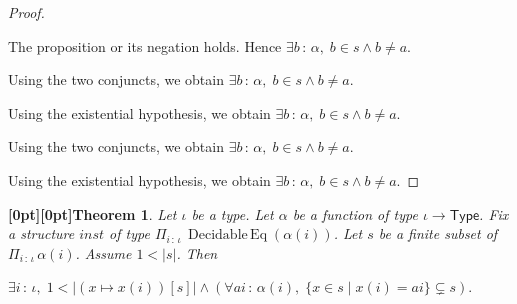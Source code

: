 \documentclass{article}
\makeatletter
\newcommand{\paperanchor}[1]{\hypertarget{#1}{}}%
\def\paperdest{\pdfextension dest}\def\paperstart{\pdfextension startlink}%
\def\paperend{\pdfextension endlink}\def\papercolor{\pdfextension colorstack}%
\let\paperdest\pdfdest\let\paperstart\pdfstartlink\let\paperend\pdfendlink\let\papercolor\pdfcolorstack
\newcommand{\paperanchor}[1]{\paperdest name{#1} xyz}%
\newcommand{\paperanchor}[1]{\special{pdf:dest (#1) [@thispage /XYZ null @ypos null]}}%
\newcommand{\paperlineanchor}[1]{\raisebox{10pt}[0pt][0pt]{\paperanchor{#1}}}
\DeclareRobustCommand{\paperresultname}[1]{\paperlineanchor{theorem:\arabic{theorem}}#1}
\theoremstyle{paperresult}
\newtheorem{theorem}{\paperresultname{Theorem}}
\newenvironment{proofstep}{\par\smallskip\ifdim\leftskip<3em\relax\advance\leftskip by 1em\relax\fi\noindent\ignorespaces}{\par\smallskip}
\makeatother
\begin{document}
\begin{proof}
\begin{proofstep}
\begin{proofstep}
\begin{proofstep}
\begin{proofstep}
\begin{proofstep}
\end{proofstep}
The proposition or its negation holds. Hence \(\exists b\, :\, \alpha,\; b \in s \land b \ne a\).
\end{proofstep}
Using the two conjuncts, we obtain \(\exists b\, :\, \alpha,\; b \in s \land b \ne a\).
\end{proofstep}
Using the existential hypothesis, we obtain \(\exists b\, :\, \alpha,\; b \in s \land b \ne a\).
\end{proofstep}
Using the two conjuncts, we obtain \(\exists b\, :\, \alpha,\; b \in s \land b \ne a\).
\end{proofstep}
Using the existential hypothesis, we obtain \(\exists b\, :\, \alpha,\; b \in s \land b \ne a\).
\end{proof}

\begin{theorem}\label{theorem:118}
Let \(\iota\) be a type. Let \(\alpha\) be a function of type \(\iota \to \mathsf{Type}\). Fix a structure \(\mathit{inst}\) of type \(\Pi_{i\, :\, \iota}\, \operatorname{Decidable\,Eq}\left(\alpha\left(i\right)\right)\). Let \(s\) be a finite subset of \(\Pi_{i\, :\, \iota}\, \alpha\left(i\right)\). Assume \(1 < \left|s\right|\). Then
\begin{center}
\(\displaystyle \exists i\, :\, \iota,\; 1 < |(x \mapsto x(i))[s]| \land (\forall \mathit{ai}\, :\, \alpha(i),\; \{x\in s \mid x(i) = \mathit{ai}\} \subsetneq s).\)
\end{center}
\end{theorem}
\end{document}
